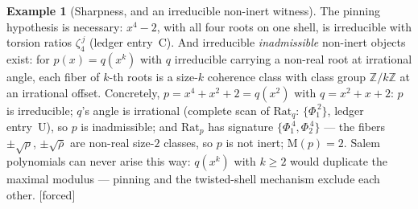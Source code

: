 \documentclass[11pt]{article}
\theoremstyle{plain}
\theoremstyle{definition}
\newtheorem{example}[theorem]{Example}
\theoremstyle{remark}
\newcommand{\Z}{\mathbb{Z}}
\newcommand{\Mah}{\mathrm{M}}
\newcommand{\Rat}{\mathrm{Rat}}
\newcommand{\F}{\textnormal{[forced]}}
\begin{document}
\begin{example}[Sharpness, and an irreducible non-inert witness]
\label{ex:twistshell}
The pinning hypothesis is necessary: $x^4-2$, with all four roots on one
shell, is irreducible with torsion ratios $\zeta_4^{\,j}$ (ledger
entry~C). And irreducible \emph{inadmissible} non-inert objects exist: for
$p(x)=q(x^k)$ with $q$ irreducible carrying a non-real root at irrational
angle, each fiber of $k$-th roots is a size-$k$ coherence class with class
group $\Z/k\Z$ at an irrational offset. Concretely,
$p=x^4+x^2+2=q(x^2)$ with $q=x^2+x+2$: $p$ is irreducible; $q$'s angle is
irrational (complete scan of $\Rat_q$: $\{\Phi_1^{\,2}\}$, ledger
entry~U), so $p$ is inadmissible; and $\Rat_p$ has signature
$\{\Phi_1^{\,4},\Phi_2^{\,4}\}$ --- the fibers $\pm\sqrt{\rho}$,
$\pm\sqrt{\overline\rho}$ are non-real size-$2$ classes, so $p$ is not
inert; $\Mah(p)=2$. Salem polynomials can never arise this way: $q(x^k)$
with $k\ge2$ would duplicate the maximal modulus --- pinning and the
twisted-shell mechanism exclude each other. \F
\end{example}
\end{document}
